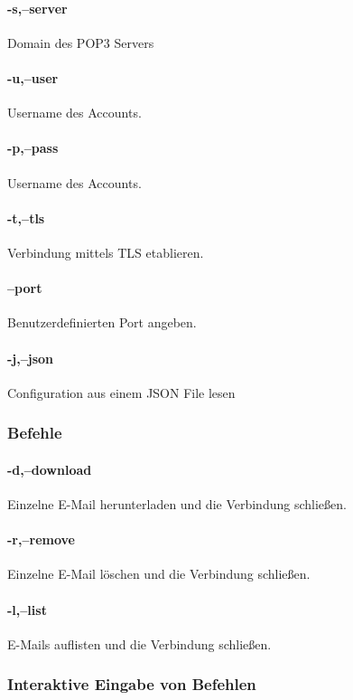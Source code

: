 \documentclass[12pt, letterpaper]{article}
\begin{document}
\paragraph{-s,--server}
Domain des POP3 Servers

\paragraph{-u,--user}
Username des Accounts.

\paragraph{-p,--pass}
Username des Accounts.

\paragraph{-t,--tls}
Verbindung mittels TLS etablieren.

\paragraph{--port}
Benutzerdefinierten Port angeben.

\paragraph{-j,--json}
Configuration aus einem JSON File lesen

\subsubsection{Befehle}
\label{commands_lab}
\paragraph{-d,--download}
Einzelne E-Mail herunterladen und die Verbindung schließen.

\paragraph{-r,--remove}
Einzelne E-Mail löschen und die Verbindung schließen.

\paragraph{-l,--list}
E-Mails auflisten und die Verbindung schließen.

\subsubsection{Interaktive Eingabe von Befehlen}
\end{document}
